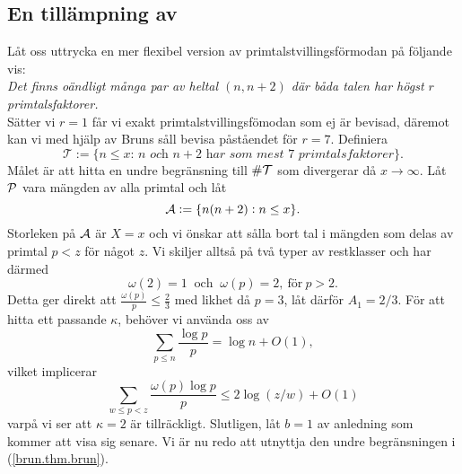 



\subsection{En tillämpning av}
Låt oss uttrycka en mer flexibel version av primtalstvillingsförmodan på följande vis:\\
\textit{Det finns oändligt många par av heltal $(n, n+2)$ där båda talen har högst $r$ primtalsfaktorer.}\\
Sätter vi $r=1$ får vi exakt primtalstvillingsfömodan som ej är bevisad, däremot kan vi med hjälp av Bruns såll bevisa påståendet för $r=7$.
Definiera
\begin{equation*}
    \mathcal{T} := \{\textit{$n\leq x$: $n$ och $n+2$ har som mest $7$ primtalsfaktorer}\}.
\end{equation*}
Målet är att hitta en undre begränsning till $\card{\mathcal{T}}$ som divergerar då $x\to\infty$. Låt $\P$ vara mängden av alla primtal och låt
\begin{equation*}
    \A := \{n(n+2): n\leq x\}.
\end{equation*}
Storleken på $\A$ är $X=x$ och vi önskar att sålla bort tal i mängden som delas av primtal $p<z$ för något $z$.
Vi skiljer alltså på två typer av restklasser och har därmed
\begin{equation*}
    \omega(2)=1\ \text{ och }\ \omega(p)=2,\ \text{för}\ p>2.
\end{equation*}
Detta ger direkt att $\frac{\omega(p)}{p}\leq\frac{2}{3}$ med likhet då $p=3$, låt därför $A_1=2/3$. För att hitta ett passande $\kappa$, behöver vi använda oss av
\begin{equation}\label{brun.eq.sum_logp_over_p}
    \sum_{p\leq n}\frac{\log p}{p} = \log n + O(1),
\end{equation}
vilket implicerar
\begin{equation*}
    \sum_{w\leq p<z} \frac{\omega(p)\log p}{p} \leq 2\log\left(z/w\right) + O(1)
\end{equation*}
varpå vi ser att $\kappa=2$ är tillräckligt. Slutligen, låt $b=1$ av anledning som kommer att visa sig senare. Vi är nu redo att utnyttja den undre begränsningen i (\ref{brun.thm.brun}). 




